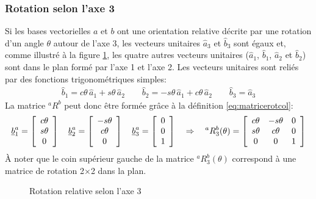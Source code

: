 \subsubsection{Rotation selon l'axe 3}
\label{sec:rot3}
%
Si les bases vectorielles $a$ et $b$ ont une orientation relative décrite par une rotation d'un angle $\theta$ autour de l'axe 3, les vecteurs unitaires $\hat{a}_3$ et $\hat{b}_3$ sont égaux et, comme illustré à la figure \ref{fig:r3vv}, les quatre autres vecteurs unitaires ($\hat{a}_1$, $\hat{b}_1$, $\hat{a}_2$ et $\hat{b}_2$) sont dans le plan formé par l'axe 1 et l'axe 2. Les vecteurs unitaires sont reliés par des fonctions trigonométriques simples: 
\begin{align}
\hat{b}_1 = c\theta \, \hat{a}_1 + s\theta \, \hat{a}_2 \quad\quad
\hat{b}_2 = -s\theta \, \hat{a}_1 + c\theta \, \hat{a}_2 \quad\quad
\hat{b}_3 = \hat{a}_3
\label{eq:rot3vecuni}
\end{align}
La matrice $^aR^b$ peut donc être formée grâce à la définition \eqref{eq:matricerotcol}:
\begin{align}
\underline{b}_1^a = \left[ \begin{array}{c} c\theta \\ s\theta \\ 0  \end{array} \right] \quad
\underline{b}_2^a = \left[ \begin{array}{c} -s\theta \\ c\theta \\ 0  \end{array} \right] \quad
\underline{b}_3^a = \left[ \begin{array}{c} 0 \\ 0 \\ 1  \end{array} \right]
\quad \Rightarrow \quad
^aR^b_3(\theta) = \left[ \begin{array}{c c c}
	c\theta & -s\theta & 0 \\
	s\theta & c\theta & 0 \\
	0 & 0 & 1 
\end{array}  \right]
\label{eq:rot3theta}
\end{align}
À noter que le coin supérieur gauche de la matrice $^aR^b_3(\theta)$ correspond à une matrice de rotation 2$\times$2 dans la plan.
%
\begin{figure}[H]
        \centering
				\hspace{+20pt}
        \caption{Rotation relative selon l'axe 3}
				\label{fig:r3vv}
\end{figure}
%


